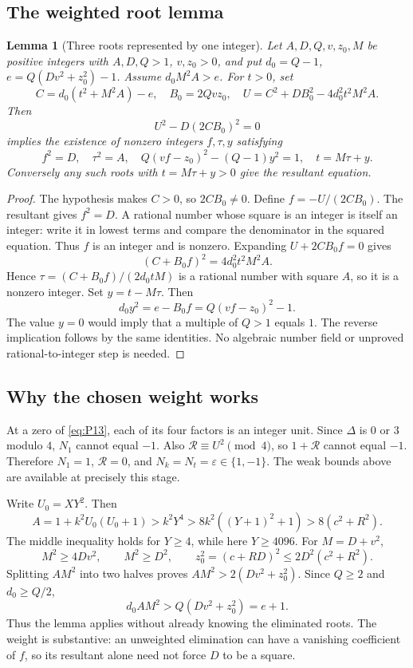 \documentclass[11pt,a4paper]{article}
\newtheorem{lemma}[theorem]{Lemma}
\theoremstyle{remark}\newtheorem{remark}[theorem]{Remark}
\begin{document}
\subsection{The weighted root lemma}
\begin{lemma}[Three roots represented by one integer]\label{lem:merge}
Let $A,D,Q,v,z_0,M$ be positive integers with $A,D,Q>1$, $v,z_0>0$,
and put $d_0=Q-1$, $e=Q(Dv^2+z_0^2)-1$.
Assume $d_0M^2A>e$. For $t>0$, set
\[
 C=d_0(t^2+M^2A)-e,\quad B_0=2Qvz_0,\quad
 U=C^2+DB_0^2-4d_0^2t^2M^2A.
\]
Then
\[
 U^2-D(2CB_0)^2=0
\]
implies the existence of nonzero integers $f,\tau,y$ satisfying
\[
 f^2=D,\quad\tau^2=A,\quad
 Q(vf-z_0)^2-(Q-1)y^2=1,\quad t=M\tau+y.
\]
Conversely any such roots with $t=M\tau+y>0$ give the resultant equation.
\end{lemma}
\begin{proof}
The hypothesis makes $C>0$, so $2CB_0\ne0$. Define
$f=-U/(2CB_0)$. The resultant gives $f^2=D$. A rational number whose
square is an integer is itself an integer: write it in lowest terms
and compare the denominator in the squared equation. Thus $f$ is an
integer and is nonzero. Expanding $U+2CB_0f=0$ gives
\[
 (C+B_0f)^2=4d_0^2t^2M^2A.
\]
Hence $\tau=(C+B_0f)/(2d_0tM)$ is a rational number with square $A$,
so it is a nonzero integer. Set $y=t-M\tau$. Then
\[
 d_0y^2=e-B_0f=Q(vf-z_0)^2-1.
\]
The value $y=0$ would imply that a multiple of $Q>1$ equals $1$.
The reverse implication follows by the same identities. No algebraic
number field or unproved rational-to-integer step is needed.
\end{proof}

\subsection{Why the chosen weight works}
At a zero of \eqref{eq:P13}, each of its four factors is an integer
unit. Since $\Delta$ is $0$ or $3$ modulo $4$, $N_1$ cannot equal
$-1$. Also $\mathcal R\equiv U^2\pmod4$, so $1+\mathcal R$ cannot
equal $-1$. Therefore $N_1=1$, $\mathcal R=0$, and
$N_k=N_t=\varepsilon\in\{1,-1\}$. The weak bounds above are
available at precisely this stage.

Write $U_0=XY^2$. Then
\[
 A=1+k^2U_0(U_0+1)>k^2Y^4>8k^2((Y+1)^2+1)>8(c^2+R^2).
\]
The middle inequality holds for $Y\ge4$, while here $Y\ge4096$.
For $M=D+v^2$,
\[
 M^2\ge4Dv^2,\qquad M^2\ge D^2,\qquad
 z_0^2=(c+RD)^2\le2D^2(c^2+R^2).
\]
Splitting $AM^2$ into two halves proves
$AM^2>2(Dv^2+z_0^2)$. Since $Q\ge2$ and $d_0\ge Q/2$,
\begin{equation}
 d_0AM^2>Q(Dv^2+z_0^2)=e+1.\label{eq:weight}
\end{equation}
Thus the lemma applies without already knowing the eliminated roots.
The weight is substantive: an unweighted elimination can have a
vanishing coefficient of $f$, so its resultant alone need not force
$D$ to be a square.
\end{document}
